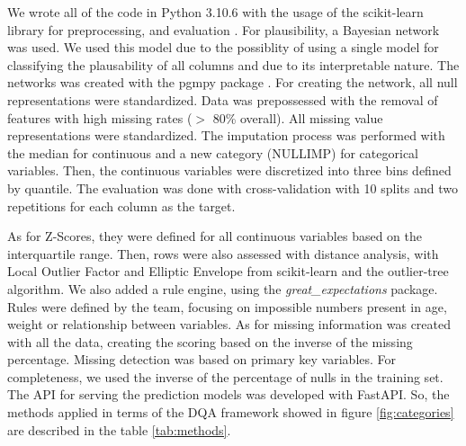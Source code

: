 We wrote all of the code in Python 3.10.6 with the usage of the scikit-learn library for preprocessing, and evaluation \cite{scikit-learn}. 
For plausibility, a Bayesian network was used. We used this model due to the possiblity of using a single model for classifying the plausability of all columns and due to its interpretable nature.
The networks was created with the pgmpy package \cite{pgmpy}. For creating the network, all null representations were standardized. Data was prepossessed with the removal of features with high missing rates ($>$ 80\% overall). All missing value representations were standardized. The imputation process was performed with the median for continuous and a new category (NULLIMP) for categorical variables. Then, the continuous variables were discretized into three bins defined by quantile. The evaluation was done with cross-validation with 10 splits and two repetitions for each column as the target. 

As for  Z-Scores, they were defined for all continuous variables based on the interquartile range. Then, rows were also assessed with distance analysis, with Local Outlier Factor and Elliptic Envelope from scikit-learn and the outlier-tree algorithm. We also added a rule engine, using the \textit{great\_expectations} package. Rules were defined by the team, focusing on impossible numbers present in age, weight or relationship between variables. As for missing information was created with all the data, creating the scoring based on the inverse of the missing percentage. Missing detection was based on primary key variables.
For completeness, we used the inverse of the percentage of nulls in the training set.
The API for serving the prediction models was developed with FastAPI. So, the methods applied in terms of the DQA framework showed in figure \ref{fig:categories} are described in the table \ref{tab:methods}.

